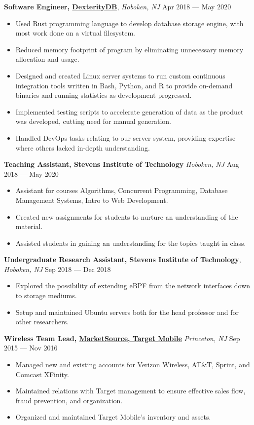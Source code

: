 \documentclass[10pt,letterpaper,roman]{moderncv}
\begin{document}
\textbf{Software Engineer, \href{https://dexteritydb.com}{DexterityDB}},
\textit{Hoboken, NJ} \hfill Apr 2018 --- May 2020
\begin{itemize}
\item Used Rust programming language to develop database storage engine, with
  most work done on a virtual filesystem.
\item Reduced memory footprint of program by eliminating unnecessary memory
  allocation and usage.
\item Designed and created Linux server systems to run custom continuous
  integration tools written in Bash, Python, and R to provide on-demand binaries
  and running statistics as development progressed.
\item Implemented testing scripts to accelerate generation of data as the
  product was developed, cutting need for manual generation.
\item Handled DevOps tasks relating to our server system, providing expertise
  where others lacked in-depth understanding.
\end{itemize}\space

\hfill

\textbf{Teaching Assistant, Stevens Institute of Technology} \textit{Hoboken,
  NJ} \hfill Aug 2018 --- May 2020
\begin{itemize}
\item Assistant for courses Algorithms, Concurrent Programming, Database
  Management Systems, Intro to Web Development.
\item Created new assignments for students to nurture an understanding of the
  material.
\item Assisted students in gaining an understanding for the topics taught in
  class.
\end{itemize}

\hfill

\textbf{Undergraduate Research Assistant, Stevens Institute of Technology},
\textit{Hoboken, NJ} \hfill Sep 2018 --- Dec 2018
\begin{itemize}
\item Explored the possibility of extending eBPF from the network interfaces
  down to storage mediums.
\item Setup and maintained Ubuntu servers both for the head professor and for
  other researchers.
\end{itemize}

\hfill

\textbf{Wireless Team Lead, \href{https://www.marketsource.com/}{MarketSource,
    Target Mobile}} \textit{Princeton, NJ} \hfill Sep 2015 --- Nov 2016
\begin{itemize}
\item Managed new and existing accounts for Verizon Wireless, AT\&T, Sprint, and
  Comcast XFinity.
\item Maintained relations with Target management to ensure effective sales
  flow, fraud prevention, and organization.
\item Organized and maintained Target Mobile's inventory and assets.
\end{itemize}
\end{document}

